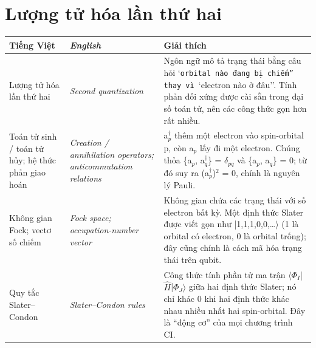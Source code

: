 \section*{Lượng tử hóa lần thứ hai}
\begin{longtable}{@{}>{\raggedright\arraybackslash}p{}>{\raggedright\arraybackslash\itshape}p{}>{\raggedright\arraybackslash}p{}@{}}
\toprule \textbf{Tiếng Việt} & \textbf{\upshape English} & \textbf{Giải thích} \\ \midrule \endhead
Lượng tử hóa lần thứ hai & Second quantization & Ngôn ngữ mô tả trạng thái bằng câu hỏi `\texttt{orbital nào đang bị chiếm'' thay vì }`electron nào ở đâu''. Tính phản đối xứng được cài sẵn trong đại số toán tử, nên các công thức gọn hơn rất nhiều. \\[2pt]
Toán tử sinh / toán tử hủy; hệ thức phản giao hoán & Creation / annihilation operators; anticommutation relations & a$^\dagger_{p}$ thêm một electron vào spin-orbital p, còn a$_{p}$ lấy đi một electron. Chúng thỏa \{a$_{p}$, a$^\dagger_{q}$\} = $\delta_{pq}$ và \{a$_{p}$, a$_{q}$\} = 0; từ đó suy ra (a$^\dagger_{p}$)$^{2}$ = 0, chính là nguyên lý Pauli. \\[2pt]
Không gian Fock; vectơ số chiếm & Fock space; occupation-number vector & Không gian chứa các trạng thái với số electron bất kỳ. Một định thức Slater được viết gọn như |1,1,1,0,0,…$\rangle$ (1 là orbital có electron, 0 là orbital trống); đây cũng chính là cách mã hóa trạng thái trên qubit. \\[2pt]
Quy tắc Slater–Condon & Slater–Condon rules & Công thức tính phần tử ma trận $\langle\Phi_{I}$|$\hat H$|$\Phi_{J}\rangle$ giữa hai định thức Slater; nó chỉ khác 0 khi hai định thức khác nhau nhiều nhất hai spin-orbital. Đây là ``động cơ'' của mọi chương trình CI. \\[2pt]
\bottomrule\end{longtable}
